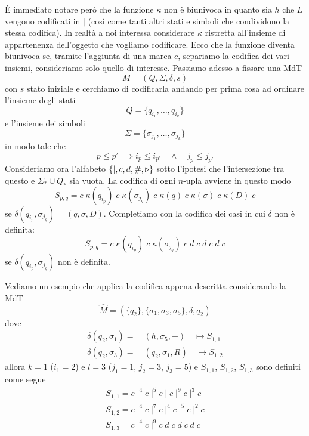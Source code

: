 \`E immediato notare però che la funzione $\kappa$ non è
biunivoca in quanto sia $h$ che $L$ vengono codificati in $\mid$
(così come tanti altri stati e simboli che condividono la stessa
codifica). In realtà a noi interessa considerare $\kappa$
ristretta all'insieme di appartenenza dell'oggetto che vogliamo
codificare. Ecco che la funzione diventa biunivoca se, tramite
l'aggiunta di una marca $c$, separiamo la codifica dei vari
insiemi, consideriamo solo quello di interesse. Passiamo adesso
a fissare una MdT
\[ M = (Q, \Sigma, \delta, s) \]
con $s$ stato iniziale e cerchiamo di codificarla andando per
prima cosa ad ordinare l'insieme degli stati
\[ Q = \{ q_{i_1}, \dots, q_{i_k} \} \]
e l'insieme dei simboli
\[ \Sigma = \{ \sigma_{j_1}, \dots, \sigma_{j_k} \} \]
in modo tale che
\[
	p \leq p' \implies i_p \leq i_{p'} \quad
	\land \quad j_p \leq j_{p'}
\]
Consideriamo ora l'alfabeto $\{ \mid, c, d, \#, \triangleright \}$ sotto
l'ipotesi che l'intersezione tra questo e $\Sigma_* \cup Q_*$
sia vuota. La codifica di ogni $n$-upla avviene in questo modo
\[
	S_{p,q} = c \; \kappa (q_{i_p})
	\; c \; \kappa (\sigma_{j_q})
	\; c \; \kappa (q)
	\; c \; \kappa (\sigma)
	\; c \; \kappa (D) \; c
\]
se $\delta (q_{i_p}, \sigma_{j_q}) = (q, \sigma, D)$. Completiamo
con la codifica dei casi in cui $\delta$ non è definita:
\[
	S_{p,q} = c \; \kappa (q_{i_p})
	\; c \; \kappa (\sigma_{j_q})
	\; c \; d \; c \; d \; c \; d \; c
\]
se $\delta(q_{i_p}, \sigma_{j_q})$ non è definita.

\begin{example}
	Vediamo un esempio che applica la codifica appena descritta
	considerando la MdT
	\[
		\hat{M} = (\{ q_2 \}, \{ \sigma_1, \sigma_3, \sigma_5 \},
		\delta, q_2)
	\]
	dove
	\begin{gather*}
		\delta(q_2, \sigma_1) = \quad (h, \sigma_5, -)
		\quad \mapsto S_{1,1} \\
		\delta(q_2, \sigma_3) = \quad (q_2, \sigma_1, R)
		\quad \mapsto S_{1,2}
	\end{gather*}
	allora $k=1$ ($i_1=2$) e $l = 3$ ($j_1 = 1$, $j_2 = 3$,
	$j_3 = 5$) e $S_{1,1}$, $S_{1,2}$, $S_{1,3}$ sono definiti
	come segue
	\begin{gather*}
		S_{1,1} = c \mid^4 c \mid^5 c \mid c \mid^9 c \mid^3 c \\
		S_{1,2} = c \mid^4 c \mid^7 c \mid^4 c \mid^5 c \mid^2 c \\
		S_{1,3} = c \mid^4 c \mid^9 c \; d \; c \; d \; c \; d \; c
	\end{gather*}
\end{example}

